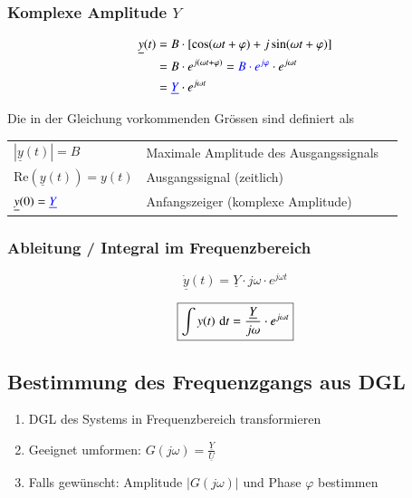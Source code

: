 \subsubsection{Komplexe Amplitude $Y$}

\vspace{-0.5cm} %
\begin{align*}
    \underline{y}(t) &= B \cdot [\cos(\omega t + \varphi) + j \sin(\omega t + \varphi)] \\
                &= B \cdot e^{j(\omega t + \varphi)} = {\color{blue}B \cdot e^{j \varphi}} \cdot e^{j \omega t} \\
                &= {\color{blue}\underline{Y}} \cdot e^{j \omega t}
\end{align*}

Die in der Gleichung vorkommenden Grössen sind definiert als \\
\begin{tabular}{lll}
    $ | \underline{y}(t) | = B$                 & Maximale Amplitude des Ausgangssignals \\
    $ \mathrm{Re}(\underline{y}(t)) = y(t)$     & Ausgangssignal (zeitlich) \\
    $ \underline{y}(0) = {\color{blue}\underline{Y}} $  & Anfangszeiger (komplexe Amplitude)
\end{tabular}


\subsubsection{Ableitung / Integral im Frequenzbereich}

\begin{minipage}[c]{0.48\columnwidth}
    $$ \boxed{ \underline{\dot{y}}(t) = \underline{Y} \cdot j \omega \cdot e^{j \omega t} } $$
\end{minipage}
\hfill
\begin{minipage}[c]{0.48\columnwidth}
    $$\boxed{ \int y(t) \, \mathop{} \! \mathrm{d} t = \frac{\underline{Y}}{j \omega} \cdot e^{j \omega t} } $$
\end{minipage}


\subsection{Bestimmung des Frequenzgangs aus DGL}

\begin{enumerate}
    \item DGL des Systems in Frequenzbereich transformieren
    \item Geeignet umformen: $G(j \omega) = \frac{\underline{Y}}{\underline{U}}$
    \item Falls gewünscht: Amplitude $|G(j \omega)|$ und Phase $\varphi$ bestimmen
\end{enumerate}


